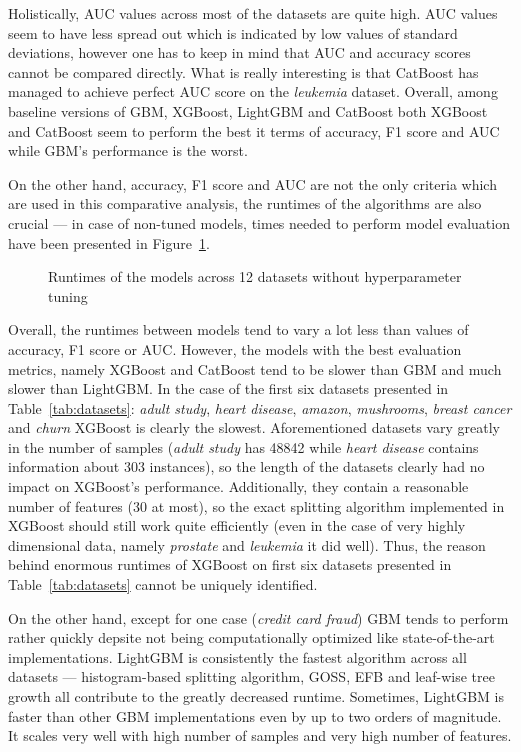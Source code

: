 \documentclass[magisterska, english]{pwr_wmat_praca_dyplomowa}
\theoremstyle{plain}
\numberwithin{theorem}{chapter}
\theoremstyle{definition}
\numberwithin{theorem}{chapter}
\begin{document}
Holistically, AUC values across most of the datasets are quite high. AUC values seem to have less spread out which is indicated by low values of standard deviations, however one has to keep in mind that AUC and accuracy scores cannot be compared directly. What is really interesting is that CatBoost has managed to achieve perfect AUC score on the \emph{leukemia} dataset. Overall, among baseline versions of GBM, XGBoost, LightGBM and CatBoost both XGBoost and CatBoost seem to perform the best it terms of accuracy, F1 score and AUC while GBM's performance is the worst.

On the other hand, accuracy, F1 score and AUC are not the only criteria which are used in this comparative analysis, the runtimes of the algorithms are also crucial --- in case of non-tuned models, times needed to perform model evaluation have been presented in Figure~\ref{fig:no_tuning_runtimes}.

\begin{figure}[H]
	\centering
	\caption{Runtimes of the models across 12 datasets without hyperparameter tuning}
	\label{fig:no_tuning_runtimes}
\end{figure}

Overall, the runtimes between models tend to vary a lot less than values of accuracy, F1 score or AUC. However, the models with the best evaluation metrics, namely XGBoost and CatBoost tend to be slower than GBM and much slower than LightGBM. In the case of the first six datasets presented in Table~\ref{tab:datasets}: \emph{adult study}, \emph{heart disease}, \emph{amazon}, \emph{mushrooms}, \emph{breast cancer} and \emph{churn} XGBoost is clearly the slowest. Aforementioned datasets vary greatly in the number of samples (\emph{adult study} has 48842 while \emph{heart disease} contains information about 303 instances), so the length of the datasets clearly had no impact on XGBoost's performance. Additionally, they contain a reasonable number of features (30 at most), so the exact splitting algorithm implemented in XGBoost should still work quite efficiently (even in the case of very highly dimensional data, namely \emph{prostate} and \emph{leukemia} it did well). Thus, the reason behind enormous runtimes of XGBoost on first six datasets presented in Table~\ref{tab:datasets} cannot be uniquely identified. 

On the other hand, except for one case (\emph{credit card fraud}) GBM tends to perform rather quickly depsite not being computationally optimized like state-of-the-art implementations. LightGBM is consistently the fastest algorithm across all datasets --- histogram-based splitting algorithm, GOSS, EFB and leaf-wise tree growth all contribute to the greatly decreased runtime. Sometimes, LightGBM is faster than other GBM implementations even by up to two orders of magnitude. It scales very well with high number of samples and very high number of features. 
\end{document}
